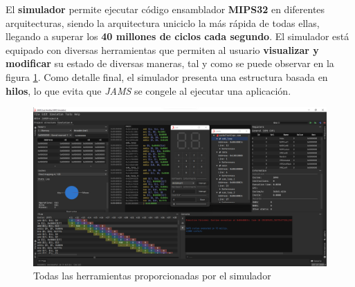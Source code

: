 El \textbf{simulador} permite ejecutar código ensamblador
\textbf{MIPS32} en diferentes arquitecturas, siendo la arquitectura
uniciclo la más rápida de todas ellas, llegando a superar los
\textbf{40 millones de ciclos cada segundo}.
El simulador está equipado con diversas herramientas que
permiten al usuario \textbf{visualizar y modificar} su estado
de diversas maneras, tal y como se puede observar en la figura \ref{fig:mips-tools}.
Como detalle final, el simulador presenta una estructura basada en
\textbf{hilos}, lo que evita que \textit{JAMS} se congele al ejecutar
una aplicación.

\begin{figure}[!t]
    \centering
    \includegraphics[width=\textwidth]{images/result/mips-tools}
    \caption{Todas las herramientas proporcionadas por el simulador}
    \label{fig:mips-tools}
    \vspace{12cm}
\end{figure}

